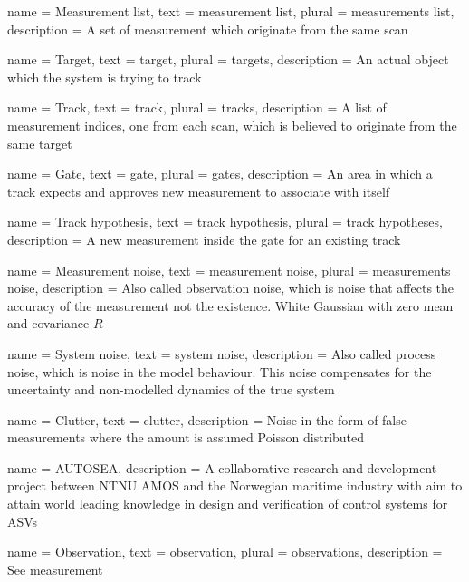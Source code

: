 {
	name 		= {Measurement list},
	text 		= {measurement list},
	plural		= {measurements list},
	description = {A set of measurement which originate from the same scan}
}

{
	name 		= Target,
	text 		= target,
	plural		= targets,
	description = {An actual object which the system is trying to track}
}

{
	name 		= Track,
	text 		= track,
	plural 		= tracks,
	description = {A list of measurement indices, one from each scan, which is believed to originate from the same target}
}

{
	name 		= Gate,
	text 		= gate,
	plural		= gates,
	description = {An area in which a track expects and approves new measurement to associate with itself}
}

{
	name 		= {Track hypothesis},
	text 		= {track hypothesis},
	plural		= {track hypotheses},
	description = {A new measurement inside the gate for an existing track}
}

{
	name 		= {Measurement noise},
	text 		= {measurement noise},
	plural		= {measurements noise},
	description = {Also called observation noise, which is noise that affects the accuracy of the measurement not the existence. White Gaussian with zero mean and covariance \(R\)}
}

{
	name 		= {System noise},
	text 		= {system noise}, 
	description = {Also called process noise, which is noise in the model behaviour. This noise compensates for the uncertainty and non-modelled dynamics of the true system}
}

{
	name 		= Clutter,
	text 		= clutter,
	description = {Noise in the form of false measurements where the amount is assumed Poisson distributed}
}

{
	name = {AUTOSEA},
	description = {A collaborative research and development project between NTNU AMOS  and the Norwegian maritime industry with aim to attain world leading knowledge in design and verification of control systems for ASVs}
}

{
	name 		= Observation,
	text 		= observation,
	plural 		= observations,
	description = {See \Gls{measurement}}
}
